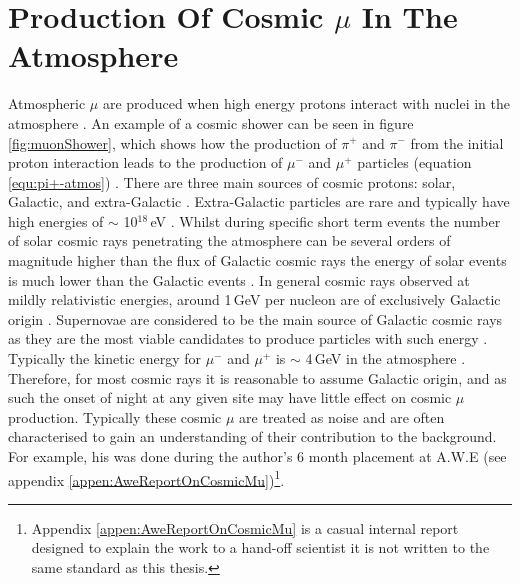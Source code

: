 \section{Production Of Cosmic $\mu$ In The Atmosphere} 
Atmospheric $\mu$ are produced when high energy protons interact with nuclei in the atmosphere \cite{griffiths2008neutrinoOscillations}. An example of a cosmic shower can be seen in figure \ref{fig:muonShower}, which shows how the production of $\pi^+$ and $\pi^-$ from the initial proton interaction leads to the production of $\mu^-$ and $\mu^+$ particles (equation \ref{equ:pi+-atmos}) \cite{griffiths2008neutrinoOscillations}. There are three main sources of cosmic protons: solar, Galactic, and extra-Galactic \cite{Drury2012OCosmicRays} \cite{muscheler2013_10be} \cite{Pierre2017Aniostropy}. Extra-Galactic particles are rare and typically have high energies of $\sim$ 10$^{18}$\,eV \cite{Pierre2017Aniostropy}. Whilst during specific short term events the number of solar cosmic rays penetrating the atmosphere can be several orders of magnitude higher than the flux of Galactic cosmic rays the energy of solar events is much lower than the Galactic events \cite{muscheler2013_10be}. In general cosmic rays observed at mildly relativistic energies, around 1\,GeV per nucleon are of exclusively Galactic origin \cite{Drury2012OCosmicRays}. Supernovae are considered to be the main source of Galactic cosmic rays as they are the most viable candidates to produce particles with such energy \cite{Drury2012OCosmicRays}. Typically the kinetic energy for $\mu^-$ and $\mu^+$ is $\sim$ 4\,GeV in the atmosphere \cite{MuonPhysics} \cite{ieee_cry_2007}. Therefore, for most cosmic rays it is reasonable to assume Galactic origin, and as such the onset of night at any given site may have little effect on cosmic $\mu$ production. Typically these cosmic $\mu$ are treated as noise and are often characterised to gain an understanding of their contribution to the background. For example, his was done during the author's 6 month placement at A.W.E (see appendix \ref{appen:AweReportOnCosmicMu})\footnote{Appendix \ref{appen:AweReportOnCosmicMu} is a casual internal report designed to explain the work to a hand-off scientist it is not written to the same standard as this thesis.}.

